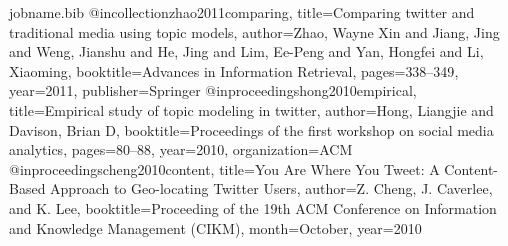 \documentclass{acm_proc_article-sp}
\begin{document}
\begin{filecontents}{jobname.bib}
@incollection{zhao2011comparing,
	title={Comparing twitter and traditional media using topic models},
	author={Zhao, Wayne Xin and Jiang, Jing and Weng, Jianshu and He, Jing and Lim, Ee-Peng and Yan, Hongfei and Li, Xiaoming},
	booktitle={Advances in Information Retrieval},
	pages={338--349},
	year={2011},
	publisher={Springer}
}
@inproceedings{hong2010empirical,
	title={Empirical study of topic modeling in twitter},
	author={Hong, Liangjie and Davison, Brian D},
	booktitle={Proceedings of the first workshop on social media analytics},
	pages={80--88},
	year={2010},
	organization={ACM}
}
@inproceedings{cheng2010content,
	title={You Are Where You Tweet: A Content-Based Approach to Geo-locating Twitter Users},
	author={Z. Cheng, J. Caverlee, and K. Lee},
	booktitle={Proceeding of the 19th ACM Conference on Information and Knowledge Management (CIKM)},
	month={October},
	year={2010}
}
\end{filecontents}

\nocite{*}




\end{document}
